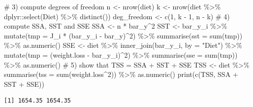 \documentclass[
  letterpaper,
  DIV=11,
  numbers=noendperiod]{scrreprt}
\newenvironment{Shaded}{\begin{snugshade}}{\end{snugshade}}
\newcommand{\AttributeTok}[1]{\textcolor[rgb]{0.40,0.45,0.13}{#1}}
\newcommand{\CommentTok}[1]{\textcolor[rgb]{0.37,0.37,0.37}{#1}}
\newcommand{\DecValTok}[1]{\textcolor[rgb]{0.68,0.00,0.00}{#1}}
\newcommand{\FunctionTok}[1]{\textcolor[rgb]{0.28,0.35,0.67}{#1}}
\newcommand{\NormalTok}[1]{\textcolor[rgb]{0.00,0.23,0.31}{#1}}
\newcommand{\OtherTok}[1]{\textcolor[rgb]{0.00,0.23,0.31}{#1}}
\newcommand{\SpecialCharTok}[1]{\textcolor[rgb]{0.37,0.37,0.37}{#1}}
\newcommand{\StringTok}[1]{\textcolor[rgb]{0.13,0.47,0.30}{#1}}
\begin{document}
\begin{Shaded}
\begin{Highlighting}[]
\CommentTok{\# 3) compute degrees of freedom}
\NormalTok{n }\OtherTok{\textless{}{-}} \FunctionTok{nrow}\NormalTok{(diet)}
\NormalTok{k }\OtherTok{\textless{}{-}} \FunctionTok{nrow}\NormalTok{(diet }\SpecialCharTok{\%\textgreater{}\%}\NormalTok{ dplyr}\SpecialCharTok{::}\FunctionTok{select}\NormalTok{(Diet) }\SpecialCharTok{\%\textgreater{}\%} \FunctionTok{distinct}\NormalTok{())}
\NormalTok{deg\_freedom }\OtherTok{\textless{}{-}} \FunctionTok{c}\NormalTok{(}\DecValTok{1}\NormalTok{, k }\SpecialCharTok{{-}} \DecValTok{1}\NormalTok{, n }\SpecialCharTok{{-}}\NormalTok{ k)}
\CommentTok{\# 4) compute SSA, SST and SSE}
\NormalTok{SSA }\OtherTok{\textless{}{-}}\NormalTok{ n }\SpecialCharTok{*}\NormalTok{ bar\_y}\SpecialCharTok{\^{}}\DecValTok{2}
\NormalTok{SST }\OtherTok{\textless{}{-}}\NormalTok{ bar\_y\_i }\SpecialCharTok{\%\textgreater{}\%} 
  \FunctionTok{mutate}\NormalTok{(}\AttributeTok{tmp =}\NormalTok{ J\_i }\SpecialCharTok{*}\NormalTok{ (bar\_y\_i }\SpecialCharTok{{-}}\NormalTok{ bar\_y)}\SpecialCharTok{\^{}}\DecValTok{2}\NormalTok{) }\SpecialCharTok{\%\textgreater{}\%} 
  \FunctionTok{summarise}\NormalTok{(}\AttributeTok{sst =} \FunctionTok{sum}\NormalTok{(tmp)) }\SpecialCharTok{\%\textgreater{}\%} 
  \FunctionTok{as.numeric}\NormalTok{()}
\NormalTok{SSE }\OtherTok{\textless{}{-}}\NormalTok{ diet }\SpecialCharTok{\%\textgreater{}\%} 
  \FunctionTok{inner\_join}\NormalTok{(bar\_y\_i, }\AttributeTok{by =} \StringTok{"Diet"}\NormalTok{) }\SpecialCharTok{\%\textgreater{}\%} 
  \FunctionTok{mutate}\NormalTok{(}\AttributeTok{tmp =}\NormalTok{ (weight.loss }\SpecialCharTok{{-}}\NormalTok{ bar\_y\_i)}\SpecialCharTok{\^{}}\DecValTok{2}\NormalTok{) }\SpecialCharTok{\%\textgreater{}\%} 
  \FunctionTok{summarise}\NormalTok{(}\AttributeTok{sse =} \FunctionTok{sum}\NormalTok{(tmp)) }\SpecialCharTok{\%\textgreater{}\%} 
  \FunctionTok{as.numeric}\NormalTok{()}
\CommentTok{\# 5) show that TSS = SSA + SST + SSE}
\NormalTok{TSS }\OtherTok{\textless{}{-}}\NormalTok{ diet }\SpecialCharTok{\%\textgreater{}\%} 
  \FunctionTok{summarise}\NormalTok{(}\AttributeTok{tss =} \FunctionTok{sum}\NormalTok{(weight.loss}\SpecialCharTok{\^{}}\DecValTok{2}\NormalTok{)) }\SpecialCharTok{\%\textgreater{}\%} 
  \FunctionTok{as.numeric}\NormalTok{()}
\FunctionTok{print}\NormalTok{(}\FunctionTok{c}\NormalTok{(TSS, SSA }\SpecialCharTok{+}\NormalTok{ SST }\SpecialCharTok{+}\NormalTok{ SSE))}
\end{Highlighting}
\end{Shaded}

\begin{verbatim}
[1] 1654.35 1654.35
\end{verbatim}
\end{document}
